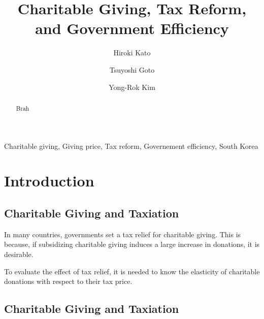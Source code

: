 \documentclass[ review  , 3p ]{elsarticle}
\begin{document}
  \begin{frontmatter}

    \title{Charitable Giving, Tax Reform, and Government Efficiency}
                \author[Osaka University]{
      Hiroki Kato 
       \corref{*} }
        \author[Chiba University]{
      Tsuyoshi Goto 
      }
        \author[Kobe University]{
      Yong-Rok Kim 
      }
            \address[Osaka University]{Graduate School of Economics, Osaka University, Japan}
        \address[Chiba University]{Graduate School of Economics, Chiba University, Japan}
        \address[Kobe University]{Graduate School of Economics, Kobe University, Japan}
      
        \begin{abstract}
      Brah
    \end{abstract}
      
        \begin{keyword}
      Charitable giving, Giving price, Tax reform, Governement efficiency, South Korea
    \end{keyword}
    
  \end{frontmatter}

  \hypertarget{introduction}{%
  \section{Introduction}\label{introduction}}

  \hypertarget{charitable-giving-and-taxiation}{%
  \subsection{Charitable Giving and Taxiation}\label{charitable-giving-and-taxiation}}

  In many countries, governments set a tax relief for charitable giving.
  This is because, if subsidizing charitable giving induces a large increase in donations, it is desirable.

  To evaluate the effect of tax relief, it is needed to know the elasticity of charitable donations with respect to their tax price.

  \hypertarget{charitable-giving-and-taxiation-1}{%
  \subsection{Charitable Giving and Taxiation}\label{charitable-giving-and-taxiation-1}}
\end{document}

